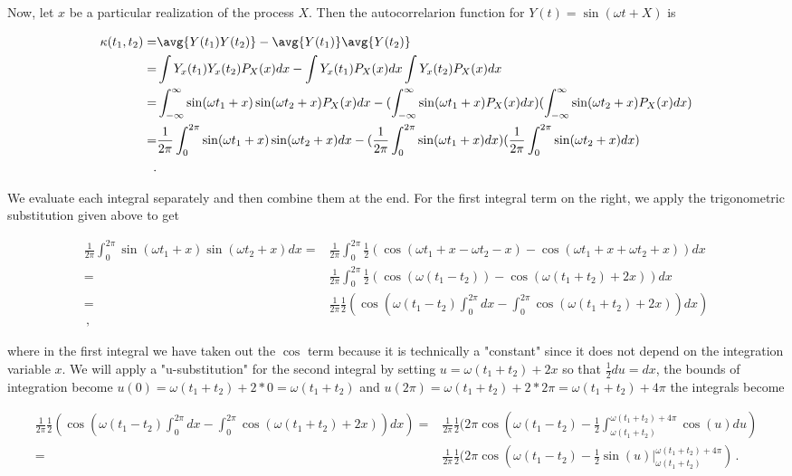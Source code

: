 Now, let $x$ be a particular realization of the process $X$. Then the autocorrelarion function for $Y(t) = \sin(\omega t + X)$ is 

\begin{align*}
    \kappa(t_1 , t_2) = & \avg{Y(t_1) Y(t_2)} - \avg{Y(t_1)} \avg{Y(t_2)} \\
    = & \int Y_{x}(t_1)Y_{x}(t_2)P_{X}(x)dx - \int Y_{x}(t_1)P_{X}(x)dx \int Y_{x}(t_2)P_{X}(x)dx \\
    = &  \int_{-\infty}^{\infty}\sin(\omega t_1 + x) \sin(\omega t_2 + x)  P_{X}(x)dx - (\int_{-\infty}^{\infty}\sin(\omega t_1 + x)P_{X}(x)dx) (\int_{-\infty}^{\infty}\sin(\omega t_2 + x)  P_{X}(x)dx) \\
    = & \frac{1}{2\pi}\int_{0}^{2\pi}\sin(\omega t_1 + x) \sin(\omega t_2 + x)dx - (\frac{1}{2\pi}\int_{0}^{2\pi}\sin(\omega t_1 + x)dx)( \frac{1}{2\pi}\int_{0}^{2\pi}\sin(\omega t_2 + x)dx) \\
    \, .
\end{align*}

We evaluate each integral separately and then combine them at the end. For the first integral term on the right, we apply the trigonometric substitution given above to get 

\begin{align*}
    \frac{1}{2\pi}\int_{0}^{2\pi}\sin(\omega t_1 + x) \sin(\omega t_2 + x)dx = &  \frac{1}{2\pi}\int_{0}^{2\pi} \frac{1}{2} (\cos(\omega t_1 + x - \omega t_2 - x) - \cos(\omega t_1 + x + \omega t_2 + x )) dx \\
    = & \frac{1}{2\pi}\int_{0}^{2\pi} \frac{1}{2} ( \cos(\omega(t_1 - t_2 ) ) - \cos(\omega(t_1 + t_2 ) + 2x) )dx \\
    = & \frac{1}{2\pi} \frac{1}{2} ( \cos(\omega(t_1 - t_2 ) \int_{0}^{2\pi} dx - \int_{0}^{2\pi} \cos(\omega(t_1 + t_2 ) + 2x) )dx ) \\
    \, ,
\end{align*}

where in the first integral we have taken out the $\cos$ term because it is technically a "constant" since it does not depend on the integration variable $x$. We will apply a "u-substitution" for the second integral by setting $u = \omega(t_1 + t_2) + 2x$ so that $\frac{1}{2} du = dx$, the bounds of integration become $u(0) = \omega(t_1 + t_2) + 2*0 = \omega(t_1 + t_2)$ and $u(2\pi) = \omega(t_1 + t_2) + 2*2\pi = \omega(t_1 + t_2) + 4\pi$ the integrals become

\begin{align*}
    \frac{1}{2\pi} \frac{1}{2} ( \cos(\omega(t_1 - t_2 ) \int_{0}^{2\pi} dx - \int_{0}^{2\pi} \cos(\omega(t_1 + t_2 ) + 2x) )dx ) = & \frac{1}{2\pi} \frac{1}{2} ( 2\pi \cos(\omega(t_1 - t_2 ) - \frac{1}{2}\int_{\omega(t_1 + t_2)}^{ \omega(t_1 + t_2) + 4\pi}\cos(u) du ) \\
    = & \frac{1}{2\pi} \frac{1}{2} ( 2\pi \cos(\omega(t_1 - t_2 ) - \frac{1}{2} \left. \sin(u)  \right|_{\omega(t_1 + t_2)}^{\omega(t_1 + t_2) + 4\pi} )
    \, .
\end{align*}

